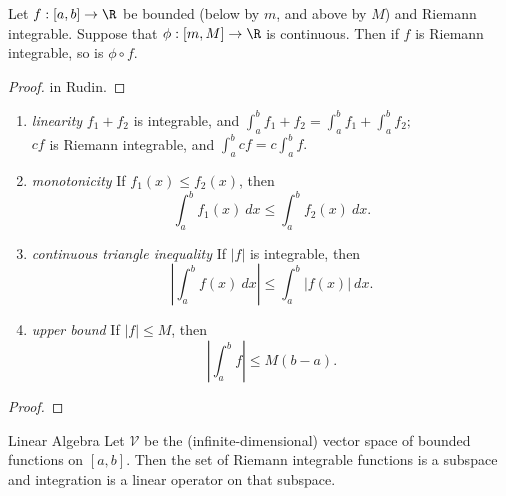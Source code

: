 \documentclass{notes}
\begin{document}
\begin{theorem}
  Let $f:[a,b] \to \R$ be bounded (below by $m$, and above by $M$) and Riemann integrable. Suppose
  that $\phi:[m, M] \to \R$ is continuous. Then if $f$ is Riemann integrable, so is $\phi\circ f$.
\end{theorem}
\begin{proof}
in Rudin.  
\end{proof}

\begin{theorem}\leavevmode
 \begin{enumerate}
   \item \emph{linearity}
     $f_1 + f_2$ is integrable, and $\int_a^b f_1 + f_2 = \int_a^b f_1 + \int_a^b f_2;$ \\
     $cf$ is Riemann integrable, and $\int_a^b cf = c\int_a^b f.$
   \item \emph{monotonicity}
     If $f_1(x) \leq f_2(x)$, then $$\int_a^b f_1(x)\ dx \leq \int_a^b f_2(x)\ dx.$$
   \item \emph{continuous triangle inequality}
     If $|f|$ is integrable, then
     $$\left| \int_a^bf(x)\ dx \right| \leq \int_a^b |f(x)|\ dx.$$
   \item \emph{upper bound} If $|f| \leq M$, then 
     $$\left| \int_a^b f  \right| \leq M(b-a).$$
 \end{enumerate} 
\end{theorem}
\begin{proof}
  
\end{proof}
\begin{aside}{Linear Algebra}
  Let $\mathcal{V}$ be the (infinite-dimensional) vector space of bounded functions on $[a,b]$. Then 
the set of Riemann integrable functions is a subspace and integration is a linear operator on that
subspace.
\end{aside}
\end{document}
